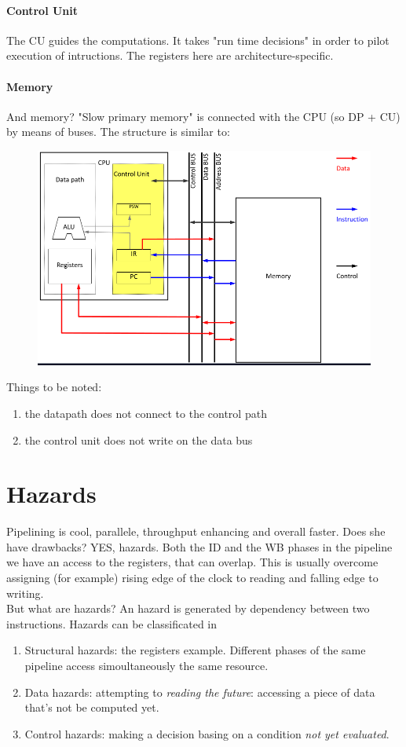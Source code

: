 \documentclass[10pt,a4paper]{article}
\begin{document}
			\paragraph{Control Unit}
				The CU guides the computations. It takes "run time decisions" in order to pilot execution of intructions. The registers here are architecture-specific.
				
			\paragraph{Memory}
				And memory? "Slow primary memory" is connected with the CPU (so DP + CU) by means of buses. The structure is similar to:
				\begin{figure}[H]
					\centering
					\includegraphics[width = \textwidth]{./images/ArchBuses.png}
				\end{figure}
				Things to be noted:
				\begin{enumerate}
					\item the datapath does not connect to the control path
					\item the control unit does not write on the data bus
				\end{enumerate}
				
		\section{Hazards}
			Pipelining is cool, parallele, throughput enhancing and overall faster. Does she have drawbacks? YES, hazards. Both the ID and the WB phases in the pipeline we have an access to the registers, that can overlap. This is usually overcome assigning (for example) rising edge of the clock to reading and falling edge to writing.\\
			But what are hazards? An hazard is generated by dependency between two instructions. Hazards can be classificated in
			\begin{enumerate}
				\item Structural hazards: the registers example. Different phases of the same pipeline access simoultaneously the same resource.
				\item Data hazards: attempting to \emph{reading the future}: accessing a piece of data that's not be computed yet. 
				\item Control hazards: making a decision basing on a condition \emph{not yet evaluated}.
			\end{enumerate}
			
\end{document}
